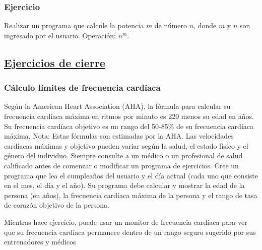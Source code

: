 \subsubsection{Ejercicio }
Realizar un programa que calcule la potencia $m$ de número $n$, donde $m$ y $n$ son ingresado por el usuario. Operación: $n^m$.
{\small
  \lstset{inputencoding=utf8/latin1}
  
}


\subsection*{\underline{Ejercicios de cierre}}
\subsubsection{Cálculo límites de frecuencia cardíaca}

Según la American Heart Association (AHA), la fórmula para calcular su frecuencia cardíaca máxima en ritmos por minuto es 220 menos su edad en años.
Su frecuencia cardíaca objetivo es un rango del 50-85\% de su frecuencia cardíaca máxima.
Nota: Estas fórmulas son estimadas por la AHA.
Las velocidades cardíacas máximas y objetivo pueden variar según la salud, el estado físico y el género del individuo.
Siempre consulte a un médico o un profesional de salud calificado antes de comenzar o modificar un programa de ejercicios.
Cree un programa que lea el cumpleaños del usuario y el día actual (cada uno que consiste en el mes, el día y el año).
Su programa debe calcular y mostrar la edad de la persona (en años), la frecuencia cardíaca máxima de la persona y el rango de tasa de corazón objetivo de la persona.

Mientras hace ejercicio, puede usar un monitor de frecuencia cardíaca para ver que su frecuencia cardíaca permanece dentro de un rango seguro sugerido por sus entrenadores y médicos


